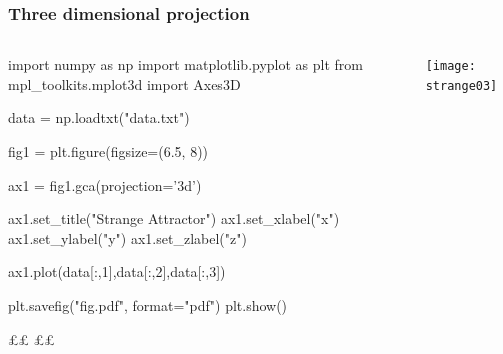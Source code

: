 \documentclass[handout, notes=hide]{beamer}
\begin{document}
\begin{frame}[fragile]
\frametitle{Three dimensional projection}
\setlength{\parskip}{0.5em}

\begin{columns}[T]
\begin{column}[T]{0.5\textwidth}
\setlength{\parskip}{0.7em}

\begin{python}
import numpy as np
import matplotlib.pyplot as plt
from mpl_toolkits.mplot3d import Axes3D

data = np.loadtxt("data.txt")

fig1 = plt.figure(figsize=(6.5, 8))

ax1 = fig1.gca(projection='3d')

ax1.set_title("Strange Attractor")
ax1.set_xlabel("x")
ax1.set_ylabel("y")
ax1.set_zlabel("z")

ax1.plot(data[:,1],data[:,2],data[:,3])



plt.savefig("fig.pdf", format="pdf")
plt.show()






££  ££
\end{python}

\end{column}
\begin{column}[T]{0.5\textwidth}
\vspace{2.5em}

\texttt{[image: strange03]}
\end{column}
\end{columns}


\end{frame}
\note{
\setlength{\parskip}{0.5em}
}

\end{document}
